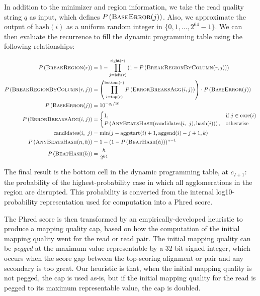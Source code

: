 \documentclass[11pt]{ucscthesis}
\newcommand{\rtop}[1]{\mathrm{top}(#1)}
\newcommand{\rbottom}[1]{\mathrm{bottom}(#1)}
\newcommand{\rleft}[1]{\mathrm{left}(#1)}
\newcommand{\rright}[1]{\mathrm{right}(#1)}
\newcommand{\core}[1]{\mathrm{core}(#1)}
\newcommand{\aggstart}[1]{\mathrm{aggstart}(#1)}
\newcommand{\aggend}[1]{\mathrm{aggend}(#1)}
\newcommand{\agghash}[1]{\mathrm{hash}(#1)}
\newcommand{\vocab}[1]{\emph{#1}}
\begin{document}
\begin{samepage}
In addition to the minimizer and region information, we take the read quality string $q$ as input, which defines $P\left({\textsc{BaseError}(j)}\right)$. Also, we approximate the output of $\agghash{i}$ as a uniform random integer in $\{0,1,\ldots,2^{64}-1\}$. We can then evaluate the recurrence to fill the dynamic programming table using the following relationships:

\nopagebreak
\begin{align*}
    \Prob{\BreakRegion{r}} &= 1 - \prod_{j = \rleft{r}}^{\rright{r}}\left( 1 - \Prob{\BreakRegionByColumn{r}{j}}\right) \nonumber \\
    \Prob{\BreakRegionByColumn{r}{j}} &= \left(\prod_{i = \rtop{r}}^{\rbottom{r}} \Prob{\ErrorBreaksAgg{i}{j}}\right) \cdot \Prob{\BaseError{j}} \nonumber \\
    \Prob{\BaseError{j}} &= 10^{-q_j / 10} \nonumber \\
    \Prob{\ErrorBreaksAgg{i}{j}} &=
        \begin{cases}
            1, & \text{if } j \in \core{i} \\
            \Prob{\AnyBeatsHash{\candidates{i}{j}}{\agghash{i}}}, & \text{otherwise}
        \end{cases} \nonumber \\
    \candidates{i}{j} &= \min(j - \aggstart{i} + 1, \aggend{i} - j + 1, k) \nonumber \\
    \Prob{\AnyBeatsHash{n}{h}} &= 1 - (1 - \Prob{\BeatHash{h}})^{n - 1} \nonumber \\
    \Prob{\BeatHash{h}} &= \frac{h}{2^{64}} \nonumber
\end{align*}
\end{samepage}


The final result is the bottom cell in the dynamic programming table, at $c_{I+1}$: the probability of the highest-probability case in which all agglomerations in the region are disrupted. This probability is converted from the internal log10-probability representation used for computation into a Phred score.

The Phred score is then transformed by an empirically-developed heuristic to produce a mapping quality cap, based on how the computation of the initial mapping quality went for the read or read pair. The initial mapping quality can be \vocab{pegged} at the maximum value representable by a 32-bit signed integer, which occurs when the score gap between the top-scoring alignment or pair and any secondary is too great. Our heuristic is that, when the initial mapping quality is not pegged, the cap is used as-is, but if the initial mapping quality for the read is pegged to its maximum representable value, the cap is doubled.
\end{document}
